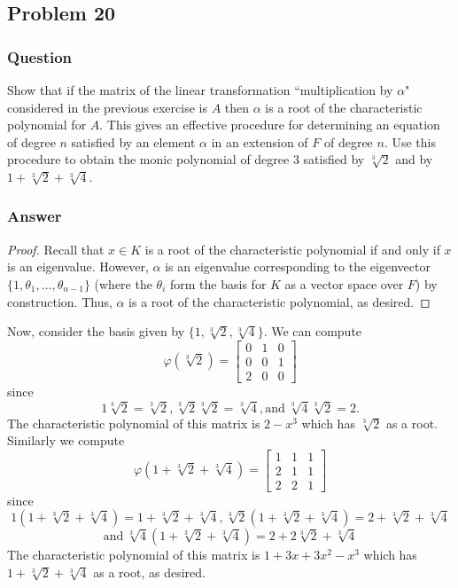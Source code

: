 \documentclass[10pt]{article}
\begin{document}
\subsection{Problem 20}
\subsubsection{Question}
Show that if the matrix of the linear transformation ``multiplication by $\alpha$" considered in the previous exercise is $A$ then $\alpha$ is a root of the characteristic polynomial for $A$. This gives an effective procedure for determining an equation of degree $n$ satisfied by an element $\alpha$ in an extension of $F$ of degree $n$. Use this procedure to obtain the monic polynomial of degree $3$ satisfied by $\sqrt[3]2$ and by $1+\sqrt[3]2+\sqrt[3]4$.
\subsubsection{Answer}
\begin{proof}
Recall that $x \in K$ is a root of the characteristic polynomial if and only if $x$ is an eigenvalue. However, $\alpha$ is an eigenvalue corresponding to the eigenvector $\{1,\theta_1, \dots, \theta_{n-1}\}$ (where the $\theta_i$ form the basis for $K$ as a vector space over $F$) by construction. Thus,  $\alpha$ is a root of the characteristic polynomial, as desired.
\end{proof}
Now, consider the basis given by $\{1,\sqrt[3]2,\sqrt[3]4\}$. We can compute
\[\varphi(\sqrt[3]2)=\left[ \begin{array}{ccc} 0&1&0 \\ 0&0&1\\2&0&0 \end{array} \right] \]
since 
\[1 \sqrt[3]2 = \sqrt[3]2, \sqrt[3]2 \sqrt[3]2 = \sqrt[3]4 ,\mathrm{and \ } \sqrt[3]4 \sqrt[3]2 = 2.\] The characteristic polynomial of this matrix is $2-x^3$ which has $\sqrt[3]2$ as a root. Similarly we compute
\[\varphi(1+\sqrt[3]2+\sqrt[3]4)=\left[ \begin{array}{ccc}1&1&1\\2&1&1\\2&2&1 \end{array}\right]\]
since 
\[ 1(1+\sqrt[3]2+\sqrt[3]4) = 1+\sqrt[3]2+\sqrt[3]4, \sqrt[3]2 (1+\sqrt[3]2+\sqrt[3]4) = 2 + \sqrt[3]2 + \sqrt[3]4\]
\[\mathrm{ and\ } \sqrt[3]4(1+\sqrt[3]2+\sqrt[3]4) = 2 + 2 \sqrt[3]2 + \sqrt[3]4\]
The characteristic polynomial of this matrix is $1+3 x+3 x^2-x^3$ which has $1+\sqrt[3]2+\sqrt[3]4$ as a root, as desired.
\end{document}
